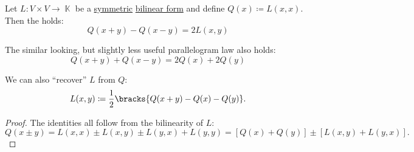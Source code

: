 \begin{proposition}\label{thm:polarization_identity}
  Let \( L: V \times V \to \BbbK \) be a \hyperref[def:symmetric_function]{symmetric} \hyperref[def:bilinear_form]{bilinear form} and define \( Q(x) \coloneqq L(x, x) \). Then the  holds:
  \begin{equation}\label{thm:polarization_identity/polarization_identity}
    Q(x + y) - Q(x - y) = 2 L(x, y)
  \end{equation}

  The similar looking, but slightly less useful parallelogram law also holds:
  \begin{equation}\label{thm:polarization_identity/parallelogram_law}
    Q(x + y) + Q(x - y) = 2 Q(x) + 2 Q(y)
  \end{equation}

  We can also \enquote{recover} \( L \) from \( Q \):
  \begin{equation}\label{thm:polarization_identity/definition}
    L(x, y) \coloneqq \frac 1 2 \bracks{ Q(x + y) - Q(x) - Q(y) }.
  \end{equation}
\end{proposition}
\begin{proof}
  The identities all follow from the bilinearity of \( L \):
  \begin{equation*}
    Q(x \pm y)
    =
    L(x, x) \pm L(x, y) \pm L(y, x) + L(y, y)
    =
    [Q(x) + Q(y)] \pm [L(x, y) + L(y, x)].
  \end{equation*}
\end{proof}

\begin{definition}\label{def:quadratic_form}
\end{definition}

